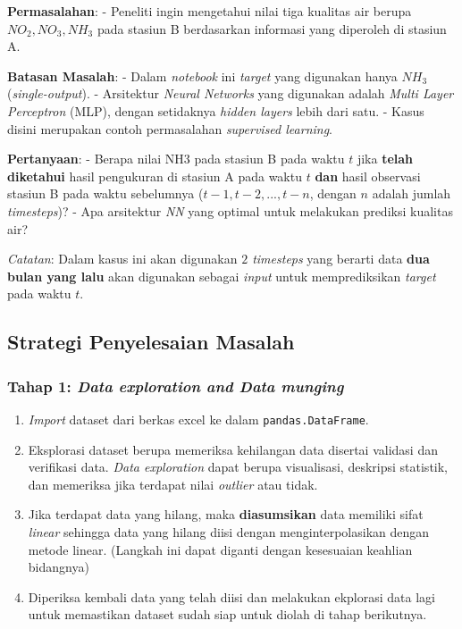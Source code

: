 \documentclass[11pt]{article}
\providecommand{\tightlist}{%
      \setlength{\itemsep}{0pt}\setlength{\parskip}{0pt}}
\begin{document}
\textbf{Permasalahan}: - Peneliti ingin mengetahui nilai tiga kualitas
air berupa \(NO_2, NO_3, NH_3\) pada stasiun B berdasarkan informasi
yang diperoleh di stasiun A.

\textbf{Batasan Masalah}: - Dalam \emph{notebook} ini \emph{target} yang
digunakan hanya \(NH_3\) (\emph{single-output}). - Arsitektur
\emph{Neural Networks} yang digunakan adalah \emph{Multi Layer
Perceptron} (MLP), dengan setidaknya \emph{hidden layers} lebih dari
satu. - Kasus disini merupakan contoh permasalahan \emph{supervised
learning}.

\textbf{Pertanyaan}: - Berapa nilai NH3 pada stasiun B pada waktu \(t\)
jika \textbf{telah diketahui} hasil pengukuran di stasiun A pada waktu
\(t\) \textbf{dan} hasil observasi stasiun B pada waktu sebelumnya
(\(t-1, t-2, ..., t-n\), dengan \(n\) adalah jumlah \emph{timesteps})? -
Apa arsitektur \emph{NN} yang optimal untuk melakukan prediksi kualitas
air?

\emph{Catatan}: Dalam kasus ini akan digunakan \emph{\(2\) timesteps}
yang berarti data \textbf{dua bulan yang lalu} akan digunakan sebagai
\emph{input} untuk memprediksikan \emph{target} pada waktu \(t\).

    \hypertarget{strategi-penyelesaian-masalah}{%
\subsection{Strategi Penyelesaian
Masalah}\label{strategi-penyelesaian-masalah}}

\hypertarget{tahap-1-data-exploration-and-data-munging}{%
\subsubsection{\texorpdfstring{Tahap 1: \emph{Data exploration and Data
munging}}{Tahap 1: Data exploration and Data munging}}\label{tahap-1-data-exploration-and-data-munging}}

\begin{enumerate}
\def\labelenumi{\arabic{enumi}.}
\tightlist
\item
  \emph{Import} dataset dari berkas excel ke dalam
  \texttt{pandas.DataFrame}.
\item
  Eksplorasi dataset berupa memeriksa kehilangan data disertai validasi
  dan verifikasi data. \emph{Data exploration} dapat berupa visualisasi,
  deskripsi statistik, dan memeriksa jika terdapat nilai \emph{outlier}
  atau tidak.
\item
  Jika terdapat data yang hilang, maka \textbf{diasumsikan} data
  memiliki sifat \emph{linear} sehingga data yang hilang diisi dengan
  menginterpolasikan dengan metode linear. (Langkah ini dapat diganti
  dengan kesesuaian keahlian bidangnya)
\item
  Diperiksa kembali data yang telah diisi dan melakukan ekplorasi data
  lagi untuk memastikan dataset sudah siap untuk diolah di tahap
  berikutnya.
\end{enumerate}
\end{document}
